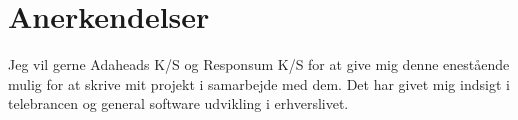 \chapter{Anerkendelser}

Jeg vil gerne Adaheads K/S og Responsum K/S for at give mig denne enestående mulig for at skrive mit projekt i samarbejde med dem. Det har givet mig indsigt i telebrancen og general software udvikling i erhverslivet.

